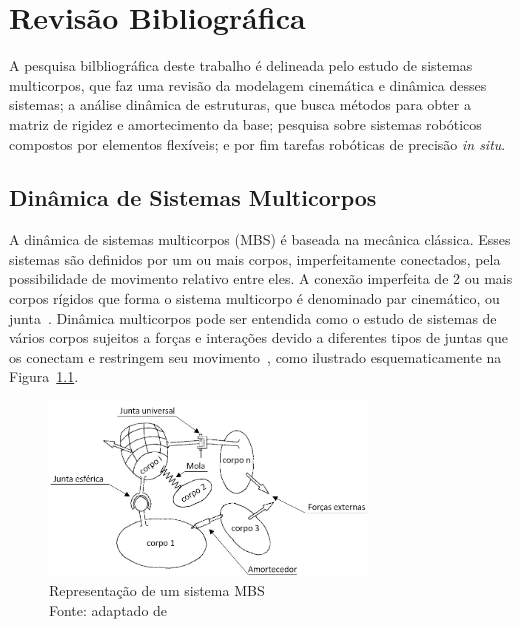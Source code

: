 \chapter{Revisão Bibliográfica}

A pesquisa bilbliográfica deste trabalho é delineada pelo estudo de sistemas
multicorpos, que faz uma revisão da modelagem cinemática e dinâmica desses
sistemas; a análise dinâmica de estruturas, que busca métodos para obter a
matriz de rigidez e amortecimento da base; pesquisa sobre sistemas robóticos
compostos por elementos flexíveis; e por fim tarefas robóticas de precisão
\textit{in situ}.


\section{Dinâmica de Sistemas Multicorpos}

A dinâmica de sistemas multicorpos (MBS) é baseada na mecânica clássica. Esses
sistemas são definidos por um ou mais corpos, imperfeitamente conectados, pela
possibilidade de movimento relativo entre eles. A conexão imperfeita de 2 ou
mais corpos rígidos que forma o sistema multicorpo é denominado par cinemático,
ou junta~\cite{de2012kinematic}. Dinâmica multicorpos pode ser entendida como o
estudo de sistemas de vários corpos sujeitos a forças e interações devido a
diferentes tipos de juntas que os conectam e restringem seu
movimento~\cite{flores2008kinematics}, como ilustrado esquematicamente na
Figura~\ref{fig::mbs_diagram}.

\begin{figure}[h]
	\centering 
 	\includegraphics[width=0.75\textwidth]{figs/mbs_diagram}
 	\caption[Representação de um sistema MBS]{Representação de um sistema MBS
 	\\Fonte: adaptado de \cite{neto2003stabilization}}
 	\label{fig::mbs_diagram}
\end{figure}

